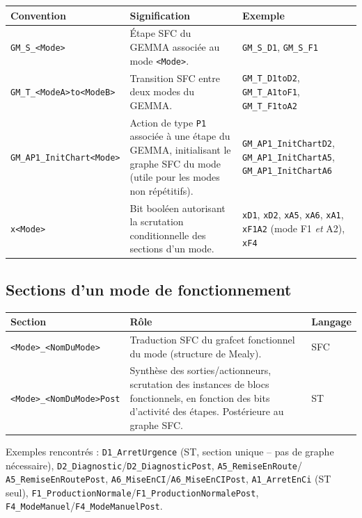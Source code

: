 \begin{center}
    \begin{tabular}{|p{3.4cm}|p{6.6cm}|p{4.2cm}|}
        \hline
        \textbf{Convention} & \textbf{Signification} & \textbf{Exemple} \\
        \hline
        \texttt{GM\_S\_<Mode>} & Étape SFC du GEMMA associée au mode \texttt{<Mode>}. & \texttt{GM\_S\_D1}, \texttt{GM\_S\_F1} \\
        \hline
        \texttt{GM\_T\_<ModeA>to<ModeB>} & Transition SFC entre deux modes du GEMMA. & \texttt{GM\_T\_D1toD2}, \texttt{GM\_T\_A1toF1}, \texttt{GM\_T\_F1toA2} \\
        \hline
        \texttt{GM\_AP1\_InitChart<Mode>} & Action de type \texttt{P1} associée à une étape du GEMMA, initialisant le graphe SFC du mode (utile pour les modes non répétitifs). & \texttt{GM\_AP1\_InitChartD2}, \texttt{GM\_AP1\_InitChartA5}, \texttt{GM\_AP1\_InitChartA6} \\
        \hline
        \texttt{x<Mode>} & Bit booléen autorisant la scrutation conditionnelle des sections d'un mode. & \texttt{xD1}, \texttt{xD2}, \texttt{xA5}, \texttt{xA6}, \texttt{xA1}, \texttt{xF1A2} (mode F1 \emph{et} A2), \texttt{xF4} \\
        \hline
    \end{tabular}
\end{center}

\subsection{Sections d'un mode de fonctionnement}

\begin{center}
    \begin{tabular}{|p{4.2cm}|p{6.4cm}|p{2.6cm}|}
        \hline
        \textbf{Section} & \textbf{Rôle} & \textbf{Langage} \\
        \hline
        \texttt{<Mode>\_<NomDuMode>} & Traduction SFC du grafcet fonctionnel du mode (structure de Mealy). & SFC \\
        \hline
        \texttt{<Mode>\_<NomDuMode>Post} & Synthèse des sorties/actionneurs, scrutation des instances de blocs fonctionnels, en fonction des bits d'activité des étapes. Postérieure au graphe SFC. & ST \\
        \hline
    \end{tabular}
\end{center}

Exemples rencontrés : \texttt{D1\_ArretUrgence} (ST, section unique -- pas de graphe nécessaire),
\texttt{D2\_Diagnostic}/\texttt{D2\_DiagnosticPost}, \texttt{A5\_RemiseEnRoute}/%
\texttt{A5\_RemiseEnRoutePost}, \texttt{A6\_MiseEnCI}/\texttt{A6\_MiseEnCIPost},
\texttt{A1\_ArretEnCi} (ST seul), \texttt{F1\_ProductionNormale}/\texttt{F1\_ProductionNormalePost},
\texttt{F4\_ModeManuel}/\texttt{F4\_ModeManuelPost}.

